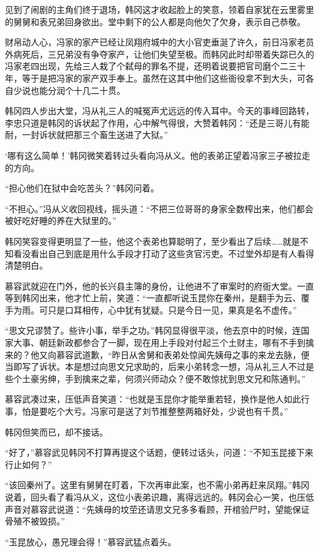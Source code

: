 见到了闹剧的主角们终于退场，韩冈这才收起脸上的笑意，领着自家犹在云里雾里的舅舅和表兄弟回身欲出。堂中剩下的公人都是向他欠了欠身，表示自己恭敬。

财帛动人心，冯家的家产已经让凤翔府城中的大小官吏垂涎了许久，前日冯家老员外病死后，三兄弟没有争夺家产，让他们失望至极。而韩冈此时却带着失踪已久的冯家老四出现，先给三人栽了个弑母的罪名不提，还明着说要把官司磨个二三十年，等于是把冯家的家产双手奉上。虽然在这其中他们这些衙役拿不到大头，可各自少说也能分润个十几二十贯。

韩冈四人步出大堂，冯从礼三人的喊冤声尤远远的传入耳中。今天的事峰回路转，李忠只道是韩冈的诉状起了作用，心中解气得很，大赞着韩冈：“还是三哥儿有能耐，一封诉状就把那三个畜生送进了大狱。”

‘哪有这么简单！’韩冈微笑着转过头看向冯从义。他的表弟正望着冯家三子被拉走的方向。

“担心他们在狱中会吃苦头？”韩冈问着。

“不担心。”冯从义收回视线，摇头道：“不把三位哥哥的身家全数榨出来，他们都会被好吃好睡的养在大狱里的。”

韩冈笑容变得更明显了一些，他这个表弟也算聪明了，至少看出了后续……就是不知看没看出自己到底是用什么手段才打动了这些贪官污吏。不过堂外却是有人看得清楚明白。

慕容武就迎在门外，他的长兴县主簿的身份，让他进不了审案时的府衙大堂。一直等到韩冈出来，他才忙上前，笑道：“一直都听说玉昆你在秦州，是翻手为云、覆手为雨。可只是口耳相传，心中犹有犹疑。只是今日一见，果真是名不虚传。”

“思文兄谬赞了。些许小事，举手之功。”韩冈显得很平淡，他去京中的时候，连国家大事、朝廷新政都参合了一脚，现在用上手段对付起三个土财主，哪有不手到擒来的？他又向慕容武道歉，“昨日从舍舅和表弟处惊闻先姨母之事的来龙去脉，便当即写了诉状。本是想过向思文兄求助的，后来小弟转念一想，冯从礼三人不过是些个土豪劣绅，手到擒来之辈，何须兴师动众？便不敢惊扰到思文兄和陈通判。”

慕容武凑过来，压低声音笑道：“也就是玉昆你才能举重若轻，换作是他人如此行事，怕是要吃个大亏。冯家可是送了刘节推整整两箱好处，少说也有千贯。”

韩冈但笑而已，却不接话。

“好了，”慕容武见韩冈不打算再提这个话题，便转过话头，问道：“不知玉昆接下来行止如何？”

“该回秦州了。这里有舅舅在盯着，下次再审此案，也不需小弟再赶来凤翔。”韩冈说着，回头看了看冯从义，这位小表弟识趣，离得远远的。韩冈会心一笑，也压低声音对慕容武说道：“先姨母的坟茔还请思文兄多多看顾，开棺验尸时，望能保证骨殖不被毁损。”

“玉昆放心，愚兄理会得！”慕容武猛点着头。

